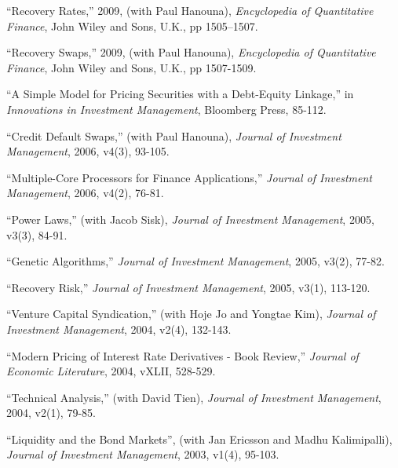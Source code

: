 \documentclass{article}
\begin{document}
\begin{etaremune}
\item ``Recovery Rates,'' 2009, (with Paul Hanouna),
{\it Encyclopedia of Quantitative Finance}, John Wiley and Sons, U.K., pp 1505--1507.  

\item ``Recovery Swaps,'' 2009, (with Paul Hanouna), 
{\it Encyclopedia of Quantitative Finance}, John Wiley and Sons, U.K., pp 1507-1509.  

\item ``A Simple Model for Pricing Securities with a Debt-Equity Linkage,'' in 
{\it Innovations in Investment Management}, Bloomberg Press, 85-112.


\item ``Credit Default Swaps,'' (with Paul Hanouna),  
{\it Journal of Investment Management}, 2006, v4(3), 93-105. 

\item ``Multiple-Core Processors for Finance Applications,'' 
{\it Journal of Investment Management}, 2006, v4(2), 76-81.

\item ``Power Laws,'' (with Jacob Sisk), 
{\it Journal of Investment Management}, 2005, v3(3), 84-91. 

\item ``Genetic Algorithms,'' 
{\it Journal of Investment Management}, 2005, v3(2), 77-82.

\item ``Recovery Risk,''
{\it Journal of Investment Management}, 2005, v3(1), 113-120. 

\item ``Venture Capital Syndication,'' (with Hoje Jo and Yongtae Kim), 
{\it Journal of Investment Management}, 2004, v2(4), 132-143. 

\item ``Modern Pricing of Interest Rate Derivatives - Book Review,''
{\it Journal of Economic Literature}, 2004, vXLII, 528-529.

\item ``Technical Analysis,'' (with David Tien),
{\it Journal of Investment Management}, 2004, v2(1), 79-85.

\item ``Liquidity and the Bond Markets'', (with Jan
Ericsson and Madhu Kalimipalli), {\it Journal of
Investment Management}, 2003, v1(4), 95-103.


\end{etaremune}
\end{document}
